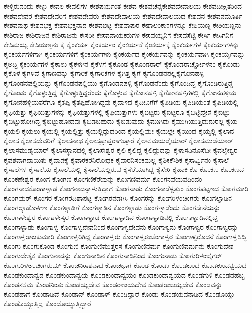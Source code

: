 {ಕೇಳ್ದಿರುವಂದು
ಕೇಳ್ದು
ಕೇವಲ
ಕೇವಲಿಗಳ
ಕೇಶಪರ್ಯಂತ
ಕೇಶವ
ಕೇಶವಚೆನ್ನಕೇಶವದೇವಾಲಯ
ಕೇಶವದೀಕ್ಷಿತರಿಂದ
ಕೇಶವದೇವರ
ಕೇಶವದೇವರಿಗೆ
ಕೇಶವದೇವರು
ಕೇಶವದೇವಾಲಯ
ಕೇಶವದೇವಾಲಯದ
ಕೇಶವನ
ಕೇಶವನಮೂರ್ತಿ
ಕೇಶವನಾಥ
ಕೇಶವಭಕ್ತ
ಕೇಶವಭಕ್ತನಾದ
ಕೇಶವಭಟ್ಟ
ಕೇಶವಾಪುರ
ಕೇಶಾಲಂಕಾರಗಳನ್ನೂ
ಕೇಶಿಯಣ್ಣ
ಕೇಶಿಯಣ್ಣನು
ಕೇಶಿರಾಜ
ಕೇಶಿರಾಜನ
ಕೇಶಿರಾಜನು
ಕೇಸರೀ
ಕೇಸವನಾಯಕರುಗಳ
ಕೇಸವಯ್ಯನಿಗೆ
ಕೇಸವಸೆಟ್ಟಿ
ಕೇಸಿಗ
ಕೇಸಿಗನಿಗೆ
ಕೇಸಿಮಯ್ಯ
ಕೇಸಿಯಣ್ಣನು
ಕೈ
ಕೈಂಕರ್ಯ
ಕೈಂಕರ್ಯಂ
ಕೈಂಕರ್ಯಕೆ
ಕೈಂಕರ್ಯಕ್ಕೆ
ಕೈಂಕರ್ಯಗಳ
ಕೈಂಕರ್ಯಗಳನ್ನು
ಕೈಂಕರ್ಯಗಳಿಗಾಗಿ
ಕೈಂಕರ್ಯಗಳಿಗೆ
ಕೈಂಕರ್ಯಗಳು
ಕೈಂಕರ್ಯದ
ಕೈಂಕರ್ಯವನ್ನು
ಕೈಂಕರ್ಯವಾಗಿ
ಕೈಂಕರ್ಯ್ಯವನ್ನು
ಕೈಅದ್ದಿ
ಕೈಕಂರ್ಯಗಳ
ಕೈಕಾಲು
ಕೈಕೆಳಗಿನ
ಕೈಕೆಳಗೆ
ಕೈಕೊಂಡ
ಕೈಕೊಂಡರಾರ್
ಕೈಕೊಂಡರಾರ್ಚ್ಚೋಳನಂ
ಕೈಕೊಂಡು
ಕೈಕೊಳೆ
ಕೈಗಳಿವೆ
ಕೈಗಾಣವನ್ನು
ಕೈಗಾರಿಕೆ
ಕೈಗಾರಿಕೆಗಳ
ಕೈಗಿತ್ತ
ಕೈಗೆ
ಕೈಗೊಂಡನಪಲ್ಲಿಕೈಗೋನಹಳ್ಳಿ
ಕೈಗೊಂಡನಪಲ್ಲಿಯನ್ನು
ಕೈಗೊಂಡನಪಲ್ಲಿಯು
ಕೈಗೊಂಡನಪಳ್ಳಿ
ಕೈಗೊಂಡನೆಂದು
ಕೈಗೊಂಡಿದ್ದ
ಕೈಗೊಂಡಿರುತ್ತಿದ್ದ
ಕೈಗೊಂಡು
ಕೈಗೊಳ್ಳುತ್ತಿದ್ದ
ಕೈಗೊಳ್ಳುತ್ತಿದ್ದರೆಂದು
ಕೈಗೊಳ್ಳುವ
ಕೈಗೋನಹಳ್ಳಿ
ಕೈಗೋನಹಳ್ಳಿಗಳಲ್ಲಿ
ಕೈಗೋನಹಳ್ಳಿಯ
ಕೈಗೋನಹಳ್ಳಿಯವರೆಗೂ
ಕೈತಪ್ಪಿ
ಕೈತಪ್ಪಿಹೋಗಿದ್ದವು
ಕೈದಾಳದ
ಕೈದೀವಿಗೆಗೆ
ಕೈಪಿಡಿಯ
ಕೈಪಿಡಿಯಂತೆ
ಕೈಪಿಡಿಯಲ್ಲಿ
ಕೈಫಿಯತ್ತು
ಕೈಫಿಯತ್ತುಗಳನ್ನು
ಕೈಫಿಯತ್ತುಗಳಲ್ಲಿ
ಕೈಫಿಯತ್ತುಗಳು
ಕೈಬಿಟ್ಟರು
ಕೈಬಿಟ್ಟರೂ
ಕೈಬಿಟ್ಟಿದ್ದೇನೆ
ಕೈಬಿಟ್ಟು
ಕೈಬಿಟ್ಟುಹೋಗಿದ್ದ
ಕೈಬಿಟ್ಟುಹೋದವು
ಕೈಬಿಡಬಹುದು
ಕೈಬಿಡುವುದು
ಕೈಮುಗಿದು
ಕೈಮುಗಿಯುತ್ತಿದುದುರಲ್ಲಿ
ಕೈಯ
ಕೈಯಲಿ
ಕೈಯಲು
ಕೈಯಲ್ಲಿ
ಕೈಯಲ್ಲಿತ್ತು
ಕೈಯಲ್ಲಿದ್ದುದರಿಂದ
ಕೈಯಲ್ಲಿಯೇ
ಕೈಯಲ್ಲೇ
ಕೈಯಿಂದ
ಕೈಯ್ಯಲ್ಲಿ
ಕೈಲಾದ
ಕೈಲಾಸ
ಕೈಲಾಸದೇವರಿಗೆ
ಕೈಲಾಸನಾಥ
ಕೈಲಾಸಪ್ರಾಪ್ತರಾಗುತ್ತಾರೆ
ಕೈಲಾಸಮಯಡೈಯಾರ್
ಕೈಲಾಸಮುಡೆಯಾರ್
ಕೈಲಾಸಮುಡೈಯಾರ್
ಕೈಲಾಸಸ್ಥಾನದಲ್ಲಿ
ಕೈಲಾಸೇಶ್ವರ
ಕೈಲಿ
ಕೈಲಿದ್ದ
ಕೈಲಿದ್ದುದನ್ನು
ಕೈಳಾಸದಿನೊಸೆದೀ
ಕೈವಲ್ಯೇಶ್ವರ
ಕೈವಶವಾಗದಾಯಿತು
ಕೈವಾಡಕ್ಕೆ
ಕೈವಾರಕರನಿರೋಧಕ
ಕೈವಾರನಿಸಂಕಮಲ್ಲ
ಕೈಶಿಕಕೌಶಿಕ
ಕೈಸಾರ್ವ್ವಿನಂ
ಕೈಸಾಲೆ
ಕೈಸಾಲೆಗಳ
ಕೈಸಾಲೆಯ
ಕೈಸಾಲೆಯಲ್ಲಿ
ಕೈಸಾಲೆಯಲ್ಲಿರುವ
ಕೈಸೆರೆಯಾಗಿದ್ದ
ಕೈಸೇರಿ
ಕೈಹಾಕಿ
ಕೊ
ಕೊಂಕಣ
ಕೊಂಕಣದ
ಕೊಂಕಣೇಶ್ವರ
ಕೊಂಗ
ಕೊಂಗಣಿ
ಕೊಂಗಣಿಕೆರೆಯನ್ನು
ಕೊಂಗಣಿವರ್ಮ
ಕೊಂಗನವೆಯವದಿಂದಂ
ಕೊಂಗನಾಡಕೊಂಗಾಳ್ನಾಡ
ಕೊಂಗನಾಡನ್ನಾಳುತ್ತಿದ್ದಾಗ
ಕೊಂಗನಾಡು
ಕೊಂಗನಾಡೆಳ್ಪತ್ತುಂ
ಕೊಂಗಪಟ್ಟಣದ
ಕೊಂಗಮಾರಿ
ಕೊಂಗಯರ್
ಕೊಂಗರ
ಕೊಂಗರದಿಶಾಪಟ್ಟ
ಕೊಂಗರನಡಗಿಸಿ
ಕೊಂಗರನ್ನು
ಕೊಂಗರಿಳಂಚಿಂಗರು
ಕೊಂಗಲ್ನಾಡಿನ
ಕೊಂಗಲ್ನಾಡೊಳಗಣ
ಕೊಂಗಳ್ನಾಡಿಗೆ
ಕೊಂಗಳ್ನಾಡಿನ
ಕೊಂಗಳ್ನಾಡು
ಕೊಂಗಳ್ನಾಡೆಂದು
ಕೊಂಗಸೇನೆಯನ್ನು
ಕೊಂಗಾಳೇಶ್ವರ
ಕೊಂಗಾಳೇಸ್ವರ
ಕೊಂಗಾಳ್ನಾಡ
ಕೊಂಗಾಳ್ನಾಡಿನ
ಕೊಂಗಾಳ್ನಾಡಿನಲ್ಲಿ
ಕೊಂಗಾಳ್ನಾಡಿನಲ್ಲಿದ್ದ
ಕೊಂಗಾಳ್ನಾಡು
ಕೊಂಗಾಳ್ವ
ಕೊಂಗಾಳ್ವದೇವನಿಂದ
ಕೊಂಗಾಳ್ವದೇವನು
ಕೊಂಗಾಳ್ವನು
ಕೊಂಗಾಳ್ವರ
ಕೊಂಗಾಳ್ವರನ್ನು
ಕೊಂಗಾಳ್ವರಾಜಕುಮಾರಿ
ಕೊಂಗಾಳ್ವರಿಗಿದ್ದ
ಕೊಂಗಾಳ್ವರು
ಕೊಂಗಾಳ್ವರುಚೆಂಗಾಳ್ವರ
ಕೊಂಗಾಳ್ವರೊಡನೆ
ಕೊಂಗಾಳ್ವಸಿದ್ಧಿ
ಕೊಂಗು
ಕೊಂಗುಕೊಂಡ
ಕೊಂಗುಣಿ
ಕೊಂಗುಣಿಮುತ್ತರಸ
ಕೊಂಗುಣಿವರ್ಮ
ಕೊಂಗುಣಿವರ್ಮನು
ಕೊಂಗುದೇಶ
ಕೊಂಗುದೇಶೈಕ
ಕೊಂಗುನಾಡನ್ನು
ಕೊಂಗುನಾಡಿನ
ಕೊಂಗುನಾಡಿನಿಂದ
ಕೊಂಗುನಾಡು
ಕೊಂಗುರಿಳಂಜೈಗರ್
ಕೊಂಗುರಿಳಅಂಚಿಂಗರುಮ್
ಕೊಂಚನಿರಾಶನಾದ
ಕೊಂಚಭಾಗ
ಕೊಂಡ
ಕೊಂಡಂ
ಕೊಂಡಕುಂದ
ಕೊಂಡಕುಂದನ್ವಯದ
ಕೊಂಡಕುಂದಾನ್ವದ
ಕೊಂಡಕುಂದಾನ್ವಯ
ಕೊಂಡಕುಂದಾನ್ವಯಂ
ಕೊಂಡಕುಂದಾನ್ವಯದ
ಕೊಂಡಗುಳಿ
ಕೊಂಡದಹಬ್ಬ
ಕೊಂಡನಸಮ
ಕೊಂಡನಿಂತು
ಕೊಂಡಯ್ಯದೇವ
ಕೊಂಡರಾಜಯದೇವ
ಕೊಂಡರಾಜಯ್ಯದೇವ
ಕೊಂಡವನ್ನು
ಕೊಂಡಹಾಗೆ
ಕೊಂಡಾಡಿವೆ
ಕೊಂಡಾನ್
ಕೊಂಡಾಳ್
ಕೊಂಡಿದ್ದಾರೆ
ಕೊಂಡು
ಕೊಂಡೆಯವನಾಡಿದ
ಕೊಂಡೊಯ್ದು
ಕೊಂಡೊಯ್ಯುತ್ತಿದ್ದ
ಕೊಂಡೊಯ್ಯುತ್ತಿದ್ದಾರೆ
}
